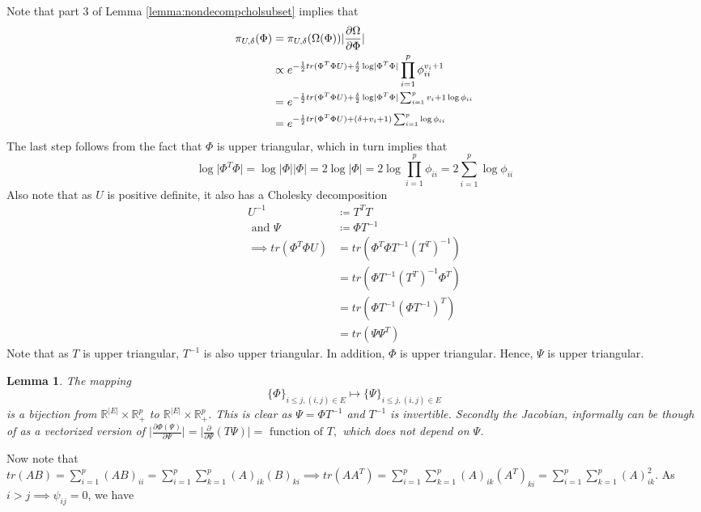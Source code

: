 \documentclass[12pt, leqno]{article}
\providecommand{\abs}[1]{\lvert#1\rvert}
\def\om{\ensuremath\Omega}
\newtheorem{lemma}{Lemma}[]
\begin{document}
Note that part 3 of Lemma \ref{lemma:nondecompcholsubset} implies
that 
\begin{align*}
\pi_{U,\delta}(\Phi) &= \pi_{U,\delta}(\om(\Phi)) \abs{\frac{\partial
  \om}{\partial \Phi}} \\
&\propto e^{-\frac{1}{2}tr(\Phi^T \Phi
  U)+\frac{\delta}{2}\log\abs{\Phi^T \Phi }} \prod_{i=1}^p
  \phi_{ii}^{v_i+1} \\
&= e^{-\frac{1}{2}tr(\Phi^T \Phi
  U)+\frac{\delta}{2}\log\abs{\Phi^T \Phi } \sum_{i=1}^p
  {v_i+1}\log \phi_{ii}} \\
&= e^{-\frac{1}{2}tr(\Phi^T \Phi
  U)+({\delta + v_i+1})\sum_{i=1}^p
  \log \phi_{ii}}
\end{align*}
The last step follows from the fact that $\Phi$ is upper triangular,
which in turn implies that 
\[
\log\abs{\Phi^T \Phi } = \log\abs{\Phi} \abs{\Phi}
  = 2 \log\abs{\Phi} =  2 \log
  \prod_{i=1}^p \phi_{ii} = 2 \sum_{i=1}^p \log \phi_{ii}
\]
Also note that as $U$ is positive definite, it also has a Cholesky
decomposition
\begin{align*}
U^{-1} &\coloneqq T^TT \\
\text{ and } \Psi &\coloneqq \Phi T^{-1}\\
\implies tr(\Phi^T \Phi U) &= tr(\Phi^T \Phi T^{-1} (T^T)^{-1}) \\
&= tr(\Phi T^{-1} (T^T)^{-1} \Phi^T )\\
&= tr(\Phi T^{-1} (\Phi T^{-1})^T )\\
&= tr(\Psi \Psi^T)
\end{align*}
Note that as $T$ is upper triangular, $T^{-1}$ is also upper
triangular. In addition, $\Phi$ is upper triangular. Hence,
$\Psi$ is upper triangular.
\begin{lemma}
\label{lemma:phitopsibijection} The mapping
\[
\{\Phi\}_{i \leq j, (i,j) \in E} \mapsto \{\Psi\}_{i \leq j, (i,j) \in E}
\]
is a bijection from $\mathbb{R}^{\abs{E}} \times \mathbb{R}_{+}^p$ to
$\mathbb{R}^{\abs{E}} \times \mathbb{R}_{+}^p$. This is clear as $\Psi
= \Phi T^{-1}$ and $T^{-1}$ is invertible. Secondly
the Jacobian, informally can be though of as a vectorized version of $\abs{\frac{\partial
  \Phi(\Psi)}{\partial \Psi}} = \abs{\frac{\partial
  }{\partial \Psi}(T \Psi)} = \text{ function of }T,$ which does not depend on $\Psi$. 
\end{lemma}
Now note that $tr(A B) = \sum_{i=1}^p (AB)_{ii} = \sum_{i=1}^p
\sum_{k=1}^p (A)_{ik} (B)_{ki} \implies  tr(A A^T) = \sum_{i=1}^p
\sum_{k=1}^p (A)_{ik} (A^T)_{ki}  = \sum_{i=1}^p
\sum_{k=1}^p (A)_{ik}^2 $. As $i>j \implies \psi_{ij} = 0$, we have
\end{document}
